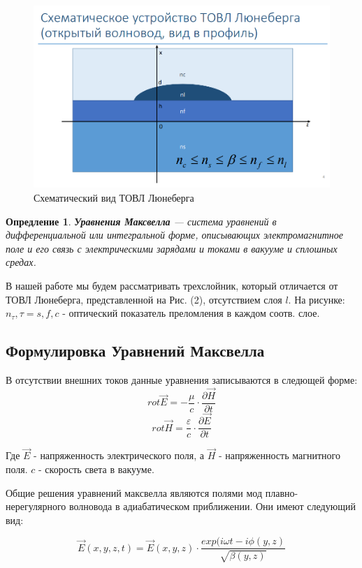 \documentclass{article}
\newtheorem{definition}{Опредление}
\begin{document}
\begin{figure}[H]
    \centering
    \includegraphics[width=\linewidth]{image2.png}
    \caption{Схематический вид ТОВЛ Люнеберга}
    \label{luneberg}
\end{figure}

\begin{definition}
{\bf Уравнения Максвелла} — система уравнений в дифференциальной или интегральной форме, описывающих электромагнитное поле и его связь с электрическими зарядами и токами в вакууме и сплошных средах.
\end{definition}

В нашей работе мы будем рассматривать трехслойник, который отличается от ТОВЛ Люнеберга, представленной на Рис. (2), отсутствием слоя $l$. На рисунке: $n_\tau, \tau = s, f, c$ - оптический показатель преломления в каждом соотв. слое.


\subsection{Формулировка Уравнений Максвелла}
В отсутствии внешних токов данные уравнения записываются в следющей форме\cite{luneberg2010}:
$$rot \vec{E} = - \frac{\mu}{c} \cdot \frac{\partial \vec{H}}{\partial t}$$
$$rot \vec{H} = \frac{\varepsilon}{c}\cdot\frac{\partial \vec{E}}{\partial t}$$

Где $\vec{E}$ - напряженность электрического поля, а $\vec{H}$ - напряженность магнитного поля. $c$ - скорость света в вакууме.

\par Общие решения уравнений максвелла являются полями мод плавно-нерегулярного волновода в адиабатическом приближении. Они имеют следующий вид:

$$\vec{E}(x, y, z, t) = \vec{E}(x, y, z) \cdot \frac{exp(i \omega t - i \phi(y, z)}{\sqrt{\beta(y, z)}}$$
\end{document}
